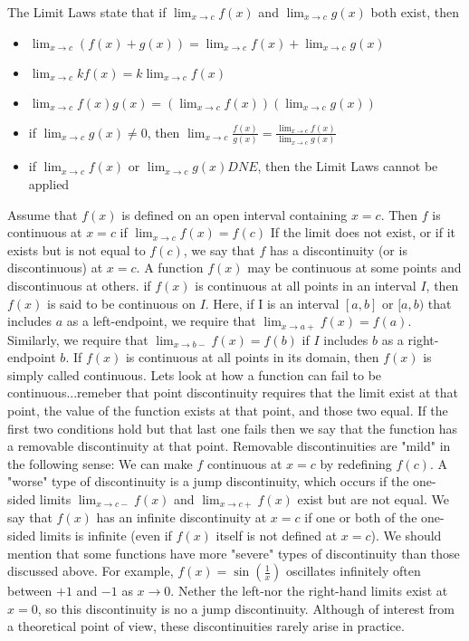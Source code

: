\documentclass{article}
\begin{document}
	The Limit Laws state that if $\lim_{x \to c}f(x)$ and $\lim_{x \to c}g(x)$ both exist, then
		\begin{itemize}
			\item $\lim_{x \to c}(f(x) + g(x)) = \lim_{x \to c}f(x) + \lim_{x \to c}g(x)$
			\item $\lim_{x \to c}kf(x) = k\lim_{x \to c}f(x)$
			\item $\lim_{x \to c}f(x)g(x) = (\lim_{x \to c}f(x))(\lim_{x \to c}g(x))$
			\item if $\lim_{x \to c}g(x) \neq 0$, then $\lim_{x \to c}\frac{f(x)}{g(x)} = \frac{\lim_{x \to c}f(x)}{\lim_{x \to c}g(x)}$
			\item if $\lim_{x \to c}f(x)$ or $\lim_{x \to c}g(x) DNE$, then the Limit Laws cannot be applied
		\end{itemize}

	Assume that $f(x)$ is defined on an open interval containing $x = c$. Then $f$ is continuous at $x = c$ if $\lim_{x \to c}f(x) = f(c)$ If the limit does not exist, or if it exists but is not equal to $f(c)$, we say that $f$ has a discontinuity (or is discontinuous) at $x = c$. A function $f(x)$ may be continuous at some points and discontinuous at others. if $f(x)$ is continuous at all points in an interval $I$, then $f(x)$ is said to be continuous on $I$. Here, if I is an interval $[a, b]$ or $[a, b)$ that includes $a$ as a left-endpoint, we require that $\lim_{x \to a+}f(x) = f(a)$. Similarly, we require that $\lim_{x \to b-}f(x) = f(b)$ if $I$ includes $b$ as a right-endpoint $b$. If $f(x)$ is continuous at all points in its domain, then $f(x)$ is simply called continuous. Lets look at how a function can fail to be continuous...remeber that point discontinuity requires that the limit exist at that point, the value of the function exists at that point, and those two equal. If the first two conditions hold but that last one fails then we say that the function has a removable discontinuity at that point. Removable discontinuities are "mild" in the following sense: We can make $f$ continuous at $x = c$ by redefining $f(c)$. A "worse" type of discontinuity is a jump discontinuity, which occurs if the one-sided limits $\lim_{x \to c-}f(x)$ and $\lim_{x \to c+}f(x)$ exist but are not equal. We say that $f(x)$ has an infinite discontinuity at $x = c$ if one or both of the one-sided limits is infinite (even if $f(x)$ itself is not defined at $x = c$). We should mention that some functions have more "severe" types of discontinuity than those discussed above. For example, $f(x) = \sin(\frac{1}{x})$ oscillates infinitely often between $+1$ and $-1$ as $x \to 0$. Nether the left-nor the right-hand limits exist at $x = 0$, so this discontinuity is no a jump discontinuity. Although of interest from a theoretical point of view, these discontinuities rarely arise in practice.\\
\end{document}
